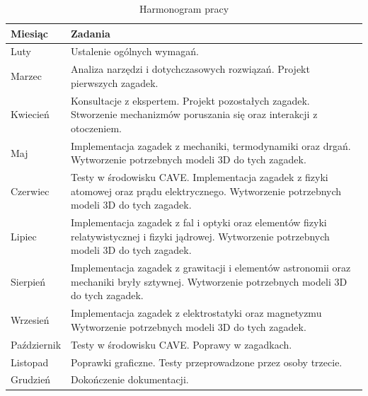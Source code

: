 \begin{table}
    \centering
    \begin{tabular}{ |p{3cm}|p{8cm}|  }
     \hline
     \textbf{Miesiąc} & \textbf{Zadania} \\ 
     \hline
     Luty & Ustalenie ogólnych wymagań. \\
     \hline
     Marzec & Analiza narzędzi i dotychczasowych rozwiązań. \newline 
     Projekt pierwszych zagadek. \\   
     \hline
     Kwiecień & Konsultacje z ekspertem. \newline 
     Projekt pozostałych zagadek. \newline
     Stworzenie mechanizmów poruszania się oraz interakcji z otoczeniem.\\ 
     \hline
     Maj & Implementacja zagadek z mechaniki, termodynamiki oraz drgań. \newline
     Wytworzenie potrzebnych modeli 3D do tych zagadek. \\
     \hline
     Czerwiec & Testy w środowisku CAVE. \newline
     Implementacja zagadek z fizyki atomowej oraz prądu elektrycznego. \newline 
     Wytworzenie potrzebnych modeli 3D do tych zagadek. \\  
     \hline
     Lipiec & Implementacja zagadek z fal i optyki oraz elementów fizyki relatywistycznej i fizyki jądrowej. \newline 
     Wytworzenie potrzebnych modeli 3D do tych zagadek. \\ 
     \hline
     Sierpień & Implementacja zagadek z grawitacji i elementów astronomii oraz mechaniki bryły sztywnej. \newline 
     Wytworzenie potrzebnych modeli 3D do tych zagadek. \\ 
     \hline
     Wrzesień & Implementacja zagadek z elektrostatyki oraz magnetyzmu \newline 
     Wytworzenie potrzebnych modeli 3D do tych zagadek. \\ 
     \hline
     Październik & Testy w środowisku CAVE. \newline
     Poprawy w zagadkach. \\ 
     \hline
     Listopad & Poprawki graficzne. \newline
     Testy przeprowadzone przez osoby trzecie. \\ 
     \hline
     Grudzień & Dokończenie dokumentacji. \\
     \hline
    \end{tabular}
    \caption{Harmonogram pracy}
    \label{tab:harmonogram}
\end{table}
    
